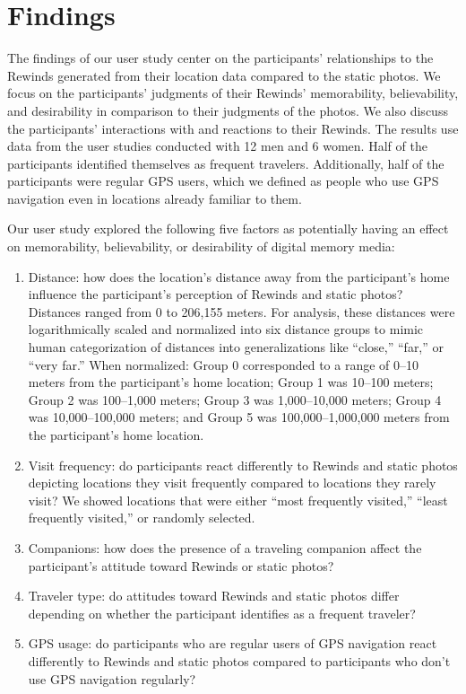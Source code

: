 \documentclass{sigchi}
\begin{document}
\section{Findings}
The findings of our user study center on the participants’ relationships to the Rewinds generated from their location data compared to the static photos. We focus on the participants’ judgments of their Rewinds’ memorability, believability, and desirability in comparison to their judgments of the photos. We also discuss the participants' interactions with and reactions to their Rewinds. The results use data from the user studies conducted with 12 men and 6 women. Half of the participants identified themselves as frequent travelers. Additionally, half of the participants were regular GPS users, which we defined as people who use GPS navigation even in locations already familiar to them.

Our user study explored the following five factors as potentially having an effect on memorability, believability, or desirability of digital memory media:
\begin{enumerate}
	\item Distance: how does the location's distance away from the participant's home influence the participant's perception of Rewinds and static photos? Distances ranged from 0 to 206,155 meters. For analysis, these distances were logarithmically scaled and normalized into six distance groups to mimic human categorization of distances into generalizations like ``close,'' ``far,'' or ``very far.'' When normalized: Group 0 corresponded to a range of 0--10 meters from the participant's home location; Group 1 was 10--100 meters; Group 2 was 100--1,000 meters; Group 3 was 1,000--10,000 meters; Group 4 was 10,000--100,000 meters; and Group 5 was 100,000--1,000,000 meters from the participant's home location.  
	\item Visit frequency: do participants react differently to Rewinds and static photos depicting locations they visit frequently compared to locations they rarely visit? We showed locations that were either ``most frequently visited,'' ``least frequently visited,'' or randomly selected.
	\item Companions: how does the presence of a traveling companion affect the participant's attitude toward Rewinds or static photos?
	\item Traveler type: do attitudes toward Rewinds and static photos differ depending on whether the participant identifies as a frequent traveler?
	\item GPS usage: do participants who are regular users of GPS navigation react differently to Rewinds and static photos compared to participants who don't use GPS navigation regularly?
\end{enumerate}
\end{document}
